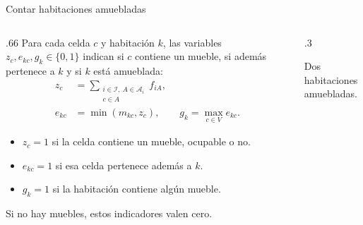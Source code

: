 \documentclass[aspectratio=169,11pt]{beamer}
\newcommand{\examplegrid}{%
  \draw[step=1,ink!35] (0,0) grid (4,4);
  \draw[ink,thick] (0,0) rectangle (4,4);
}
\begin{document}
\begin{frame}{Contar habitaciones amuebladas}
  \begin{columns}[T,onlytextwidth]
  \begin{column}{.66\textwidth}
  \small
  Para cada celda \(c\) y habitaci\'on \(k\), las variables
  \(z_c,e_{kc},g_k\in\{0,1\}\) indican si \(c\) contiene un mueble,
  si adem\'as pertenece a \(k\) y si \(k\) est\'a amueblada:
  \[
    \begin{aligned}
      z_c&=\sum_{\substack{i\in\mathcal I,\ A\in\mathcal A_i\\c\in A}}f_{iA},\\
      e_{kc}&=\min(m_{kc},z_c),\qquad g_k=\max_{c\in V}e_{kc}.
    \end{aligned}
  \]
  \begin{itemize}
    \setlength{\itemsep}{4mm}
    \item \(z_c=1\) si la celda contiene un mueble, ocupable o no.
    \item \(e_{kc}=1\) si esa celda pertenece adem\'as a \(k\).
    \item \(g_k=1\) si la habitaci\'on contiene alg\'un mueble.
  \end{itemize}
  \small Si no hay muebles, estos indicadores valen cero.
  \end{column}
  \begin{column}{.3\textwidth}
    \centering
    \par\smallskip\scriptsize Dos habitaciones amuebladas.
  \end{column}
  \end{columns}
\end{frame}
\end{document}
